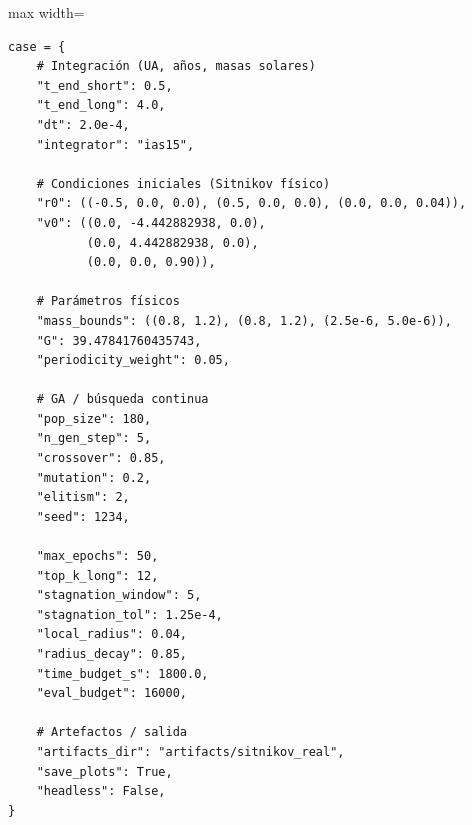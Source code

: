 \begin{listing}[H]
\caption{Declaración del diccionario \texttt{case} en el notebook Caso02}
\label{lst:c02_case} %
\begin{adjustbox}{max width=\textwidth}
\begin{minipage}{\textwidth}
\begin{verbatim}
case = {
    # Integración (UA, años, masas solares)
    "t_end_short": 0.5,
    "t_end_long": 4.0,
    "dt": 2.0e-4,
    "integrator": "ias15",

    # Condiciones iniciales (Sitnikov físico)
    "r0": ((-0.5, 0.0, 0.0), (0.5, 0.0, 0.0), (0.0, 0.0, 0.04)),
    "v0": ((0.0, -4.442882938, 0.0),
           (0.0, 4.442882938, 0.0),
           (0.0, 0.0, 0.90)),

    # Parámetros físicos
    "mass_bounds": ((0.8, 1.2), (0.8, 1.2), (2.5e-6, 5.0e-6)),
    "G": 39.47841760435743,
    "periodicity_weight": 0.05,

    # GA / búsqueda continua
    "pop_size": 180,
    "n_gen_step": 5,
    "crossover": 0.85,
    "mutation": 0.2,
    "elitism": 2,
    "seed": 1234,

    "max_epochs": 50,
    "top_k_long": 12,
    "stagnation_window": 5,
    "stagnation_tol": 1.25e-4,
    "local_radius": 0.04,
    "radius_decay": 0.85,
    "time_budget_s": 1800.0,
    "eval_budget": 16000,

    # Artefactos / salida
    "artifacts_dir": "artifacts/sitnikov_real",
    "save_plots": True,
    "headless": False,
}
\end{verbatim}
\end{minipage}
\end{adjustbox}
\end{listing}

